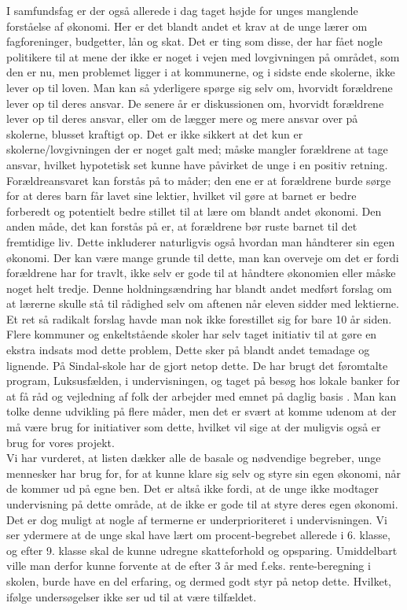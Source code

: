 I samfundsfag er der også allerede i dag taget højde for unges manglende forståelse af økonomi. Her er det blandt andet et krav at de unge lærer om fagforeninger, budgetter, lån og skat. Det er ting som disse, der har fået nogle politikere til at mene der ikke er noget i vejen med lovgivningen på området, som den er nu, men problemet ligger i at kommunerne, og i sidste ende skolerne, ikke lever op til loven\cite{BusinessDK3}. Man kan så yderligere spørge sig selv om, hvorvidt forældrene lever op til deres ansvar. De senere år er diskussionen om, hvorvidt forældrene lever op til deres ansvar, eller om de lægger mere og mere ansvar over på skolerne, blusset kraftigt op. Det er ikke sikkert at det kun er skolerne/lovgivningen der er noget galt med; måske mangler forældrene at tage ansvar, hvilket hypotetisk set kunne have påvirket de unge i en positiv retning. Forældreansvaret kan forstås på to måder; den ene er at forældrene burde sørge for at deres barn får lavet sine lektier, hvilket vil gøre at barnet er bedre forberedt og potentielt bedre stillet til at lære om blandt andet økonomi. Den anden måde, det kan forstås på er, at forældrene bør ruste barnet til det fremtidige liv. Dette inkluderer naturligvis også hvordan man håndterer sin egen økonomi. Der kan være mange grunde til dette, man kan overveje om det er fordi forældrene har for travlt, ikke selv er gode til at håndtere økonomien eller måske noget helt tredje. Denne holdningsændring har blandt andet medført forslag om at lærerne skulle stå til rådighed selv om aftenen når eleven sidder med lektierne. Et ret så radikalt forslag havde man nok ikke forestillet sig for bare 10 år siden\cite{ForaldreAnsvar}.\\

Flere kommuner og enkeltstående skoler har selv taget initiativ til at gøre en ekstra indsats mod dette problem, Dette sker på blandt andet temadage og lignende. På Sindal-skole har de gjort netop dette. De har brugt det føromtalte program, Luksusfælden, i undervisningen, og taget på besøg hos lokale banker for at få råd og vejledning af folk der arbejder med emnet på daglig basis \cite{Sindal}. Man kan tolke denne udvikling på flere måder, men det er svært at komme udenom at der må være brug for initiativer som dette, hvilket vil sige at der muligvis også er brug for vores projekt.\\

Vi har vurderet, at listen dækker alle de basale og nødvendige begreber, unge mennesker har brug for, for at kunne klare sig selv og styre sin egen økonomi, når de kommer ud på egne ben. Det er altså ikke fordi, at de unge ikke modtager undervisning på dette område, at de ikke er gode til at styre deres egen økonomi. Det er dog muligt at nogle af termerne er underprioriteret i undervisningen. Vi ser ydermere at de unge skal have lært om procent-begrebet allerede i 6. klasse, og efter 9. klasse skal de kunne udregne skatteforhold og opsparing. Umiddelbart ville man derfor kunne forvente at de efter 3 år med f.eks. rente-beregning i skolen, burde have en del erfaring, og dermed godt styr på netop dette. Hvilket, ifølge undersøgelser ikke ser ud til at være tilfældet.